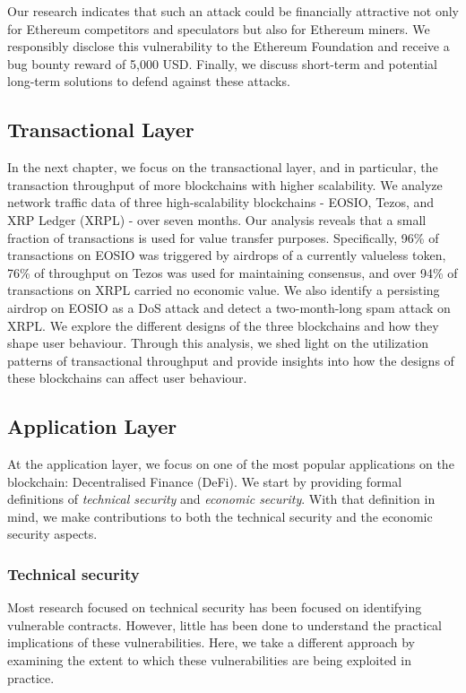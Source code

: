 Our research indicates that such an attack could be financially attractive not only for Ethereum competitors and speculators but also for Ethereum miners. We responsibly disclose this vulnerability to the Ethereum Foundation and receive a bug bounty reward of 5,000 USD. Finally, we discuss short-term and potential long-term solutions to defend against these attacks.

\subsection{Transactional Layer}
In the next chapter, we focus on the transactional layer, and in particular, the transaction throughput of more blockchains with higher scalability.
We analyze network traffic data of three high-scalability blockchains - EOSIO, Tezos, and XRP Ledger (XRPL) - over seven months.
Our analysis reveals that a small fraction of transactions is used for value transfer purposes.
Specifically, 96\% of transactions on EOSIO was triggered by airdrops of a currently valueless token, 76\% of throughput on Tezos was used for maintaining consensus, and over 94\% of transactions on XRPL carried no economic value. We also identify a persisting airdrop on EOSIO as a DoS attack and detect a two-month-long spam attack on XRPL.
We explore the different designs of the three blockchains and how they shape user behaviour.
Through this analysis, we shed light on the utilization patterns of transactional throughput and provide insights into how the designs of these blockchains can affect user behaviour.

\subsection{Application Layer}
At the application layer, we focus on one of the most popular applications on the blockchain: Decentralised Finance (DeFi).
We start by providing formal definitions of \emph{technical security} and \emph{economic security}.
With that definition in mind, we make contributions to both the technical security and the economic security aspects.

\subsubsection{Technical security}

Most research focused on technical security has been focused on identifying vulnerable contracts.
However, little has been done to understand the practical implications of these vulnerabilities.
Here, we take a different approach by examining the extent to which these vulnerabilities are being exploited in practice.

